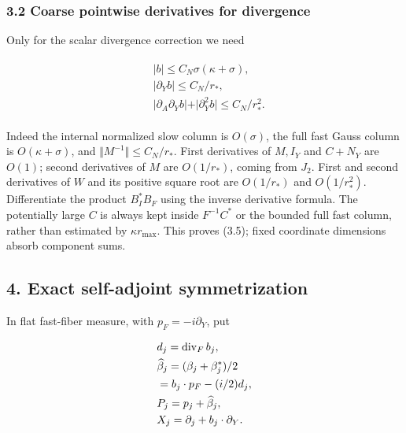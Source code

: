 \subsubsection{3.2 Coarse pointwise derivatives for
divergence}\label{g-coarse-pointwise-derivatives-for-divergence}

Only for the scalar divergence correction we need

\begin{gather*}
\begin{aligned}
& \vert b\vert  \le  C_{N} \sigma (\kappa +\sigma ), \\
& \vert \partial _{Y} b\vert  \le  C_{N}/r_{*}, \\
& \vert \partial _{A} \partial _{Y} b\vert +\vert \partial _{Y}^{2} b\vert  \le  C_{N}/r_{*}^{2}.
\end{aligned}\tag{3.5}
\end{gather*}

Indeed the internal normalized slow column is \(O(\sigma )\), the full
fast Gauss column is \(O(\kappa +\sigma )\), and
\(\Vert M^{-1}\Vert \le C_{N}/r_{*}\). First derivatives of \(M, I_{Y}\)
and \(C+N_{Y}\) are \(O(1)\); second derivatives of \(M\) are
\(O(1/r_{*})\), coming from \(J_{2}\). First and second derivatives of
\(W\) and its positive square root are \(O(1/r_{*})\) and
\(O(1/r_{*}^{2})\). Differentiate the product \(B_{I}^{*}B_{F}\) using
the inverse derivative formula. The potentially large \(C\) is always
kept inside \(F^{-1} C^{*}\) or the bounded full fast column, rather
than estimated by \(\kappa  r_{\max}\). This proves (3.5); fixed
coordinate dimensions absorb component sums.

\subsection{4. Exact self-adjoint
symmetrization}\label{g-exact-self-adjoint-symmetrization}

In flat fast-fiber measure, with \(p_{F}=-i \partial _{Y}\), put

\begin{gather*}
\begin{aligned}
& d_{j}=\operatorname{div} _{F} b_{j}, \\
& \widehat{\beta}_{j}=(\beta _{j}+\beta _{j}^{*})/2 \\
& =b_{j} \cdot  p_{F}-(i/2)d_{j}, \\
& P_{j}=p_{j}+\widehat{\beta}_{j}, \\
& X_{j}=\partial _{j}+b_{j} \cdot  \partial _{Y}.
\end{aligned}\notag
\end{gather*}

